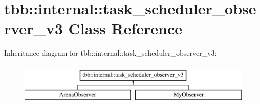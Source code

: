 \hypertarget{classtbb_1_1internal_1_1task__scheduler__observer__v3}{}\section{tbb\+:\+:internal\+:\+:task\+\_\+scheduler\+\_\+observer\+\_\+v3 Class Reference}
\label{classtbb_1_1internal_1_1task__scheduler__observer__v3}
Inheritance diagram for tbb\+:\+:internal\+:\+:task\+\_\+scheduler\+\_\+observer\+\_\+v3\+:\begin{figure}[H]
\begin{center}
\leavevmode
\includegraphics[height=2.000000cm]{classtbb_1_1internal_1_1task__scheduler__observer__v3}
\end{center}
\end{figure}
